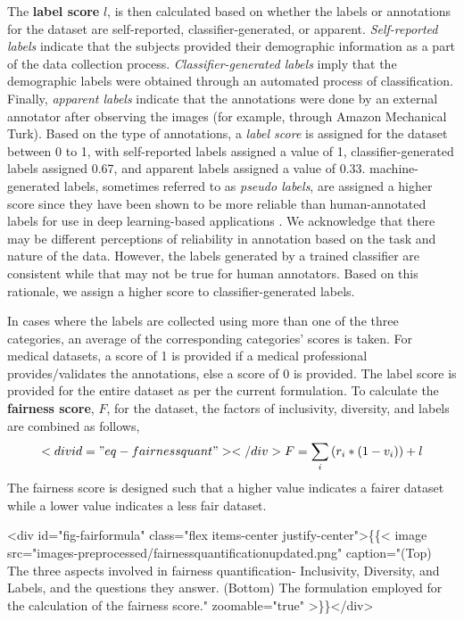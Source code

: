 \documentclass[journal]{IEEEtran}
\begin{document}
The \textbf{label score} $l$, is then calculated based on whether the labels or annotations for the dataset are self-reported, classifier-generated, or apparent. \textit{Self-reported labels} indicate that the subjects provided their demographic information as a part of the data collection process. \textit{Classifier-generated labels} imply that the demographic labels were obtained through an automated process of classification. Finally, \textit{apparent labels} indicate that the annotations were done by an external annotator after observing the images (for example, through Amazon Mechanical Turk). Based on the type of annotations, a \textit{label score} is assigned for the dataset between 0 to 1, with self-reported labels assigned a value of 1, classifier-generated labels assigned 0.67, and apparent labels assigned a value of 0.33. machine-generated labels, sometimes referred to as {\em pseudo labels}, are assigned a higher score since they have been shown to be more reliable than human-annotated labels for use in deep learning-based applications \cite{lee2013pseudo, tuan2017regressing, chang2019deep}. We acknowledge that there may be different perceptions of reliability in annotation based on the task and nature of the data. However, the labels generated by a trained classifier are consistent while that may not be true for human annotators. Based on this rationale, we assign a higher score to classifier-generated labels. 

In cases where the labels are collected using more than one of the three categories, an average of the corresponding categories' scores is taken. For medical datasets, a score of 1 is provided if a medical professional provides/validates the annotations, else a score of 0 is provided. The label score is provided for the entire dataset as per the current formulation. To calculate the \textbf{fairness score}, $F$, for the dataset, the factors of inclusivity, diversity, and labels are combined as follows,
\begin{equation} <div id="eq-fairnessquant"></div>

F = \sum_i{(r_i * (1 - v_i))} + l
\end{equation}
The fairness score is designed such that a higher value indicates a fairer dataset while a lower value indicates a less fair dataset.

<div id="fig-fairformula" class="flex items-center justify-center">\{\{< image src="images-preprocessed/fairnessquantificationupdated.png" caption="(Top) The three aspects involved in fairness quantification- Inclusivity, Diversity, and Labels, and the questions they answer. (Bottom) The formulation employed for the calculation of the fairness score." zoomable="true" >\}\}</div>
\end{document}
